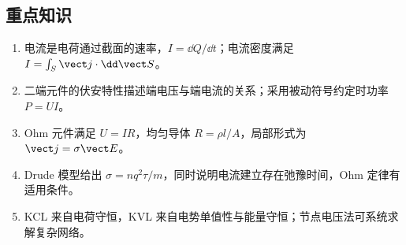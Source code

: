 \subsection*{重点知识}

\begin{enumerate}[label=\textbf{33.\arabic*},leftmargin=4.2em]
  \item 电流是电荷通过截面的速率，$I=\dd Q/\dd t$；电流密度满足
  $I=\int_S\vect j\cdot\dd\vect S$。
  \item 二端元件的伏安特性描述端电压与端电流的关系；采用被动符号约定时功率 $P=UI$。
  \item Ohm 元件满足 $U=IR$，均匀导体 $R=\rho l/A$，局部形式为 $\vect j=\sigma\vect E$。
  \item Drude 模型给出 $\sigma=nq^2\tau/m$，同时说明电流建立存在弛豫时间，Ohm 定律有适用条件。
  \item KCL 来自电荷守恒，KVL 来自电势单值性与能量守恒；节点电压法可系统求解复杂网络。
\end{enumerate}
